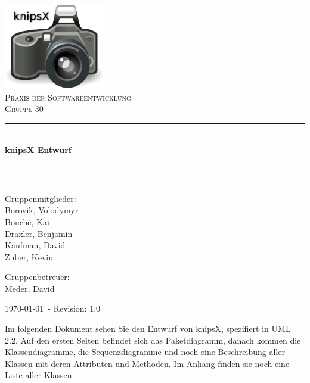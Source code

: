 \documentclass{scrartcl}
\newcommand{\HRule}{\rule{\linewidth}{0.5mm}}
\begin{document}
\begin{titlepage}
 
\begin{center}
 
 
\includegraphics[width=0.33\textwidth]{cover.eps}\\[3cm]
 
\textsc{\LARGE Praxis der Softwareentwicklung}\\[1.5cm]
 
\textsc{\Large Gruppe 30}\\[0.5cm]
 
 
\HRule \\[0.4cm]
{ \huge \bfseries knipsX Entwurf}\\[0.4cm]
 
\HRule \\[1.5cm]
 
\begin{minipage}{0.4\textwidth}
\begin{flushleft} \large

Gruppenmitglieder: \\
Borovik, Volodymyr \\
Bouché, Kai \\
Draxler, Benjamin \\
Kaufman, David \\
Zuber, Kevin

\end{flushleft}
\end{minipage}
\begin{minipage}{0.4\textwidth}
\begin{flushright} \large
Gruppenbetreuer: \\
Meder, David
\end{flushright}
\end{minipage} 
\vfill

{\large \today ~- Revision: 1.0}
 
\end{center}
\end{titlepage}


Im folgenden Dokument sehen Sie den Entwurf von knipsX, spezifiert in UML 2.2. Auf den ersten Seiten befindet sich das Paketdiagramm, danach kommen die Klassendiagramme, die Sequenzdiagramme und noch eine Beschreibung aller Klassen mit deren Attributen und Methoden. Im Anhang finden sie noch eine Liste aller Klassen.
\end{document}
